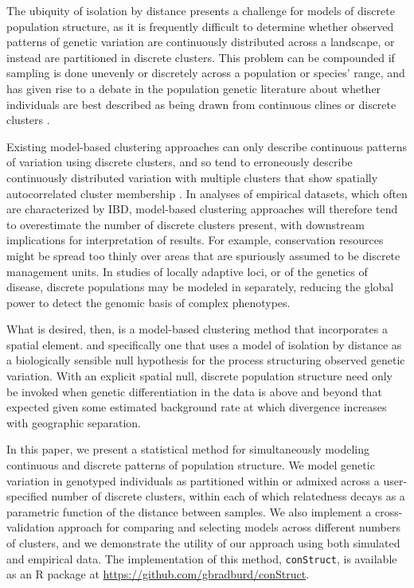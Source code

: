 \documentclass[12pt]{article}
\begin{document}
The ubiquity of isolation by distance presents a challenge for models of discrete population structure,
as it is frequently difficult to determine whether observed patterns of genetic variation are 
continuously distributed across a landscape, or instead are partitioned in discrete clusters.
This problem can be compounded if sampling is done unevenly or discretely across a population or species' range,
and has given rise to a debate in the population genetic literature about whether 
individuals are best described as being drawn from continuous clines or discrete clusters 
\citep[e.g.][]{SerrePaabo2004,rosenberg2005clines}.

Existing model-based clustering approaches can only describe continuous patterns of variation using
discrete clusters, 
and so tend to erroneously describe continuously distributed variation with multiple clusters that 
show spatially autocorrelated cluster membership \citep{Frantz2009,Meirmans2012}.
In analyses of empirical datasets, which often are characterized by IBD,
model-based clustering approaches will therefore tend to overestimate the number of discrete clusters present,
with downstream implications for interpretation of results.
For example, conservation resources might be spread too thinly over areas 
that are spuriously assumed to be discrete management units.
In studies of locally adaptive loci, or of the genetics of disease,
discrete populations may be modeled in separately,
reducing the global power to detect the genomic basis of complex phenotypes.

What is desired, then, is a model-based clustering method that incorporates a spatial element.
and specifically one that uses a model of isolation by distance as a biologically sensible null hypothesis 
for the process structuring observed genetic variation.
With an explicit spatial null, discrete population structure need only be invoked when genetic differentiation 
in the data is above and beyond that expected given some estimated background rate at which divergence 
increases with geographic separation.

In this paper, we present a statistical method for simultaneously 
modeling continuous and discrete patterns of population structure.
We model genetic variation in genotyped individuals as 
partitioned within or admixed across a user-specified number of discrete clusters,
within each of which relatedness decays as a parametric function of the distance between samples.
We also implement a cross-validation approach for comparing and selecting models across different numbers of clusters,
and we demonstrate the utility of our approach using both simulated and empirical data.
The implementation of this method, \texttt{conStruct}, is available as an R package at \href{https://github.com/gbradburd/conStruct}{https://github.com/gbradburd/conStruct}.
\end{document}
